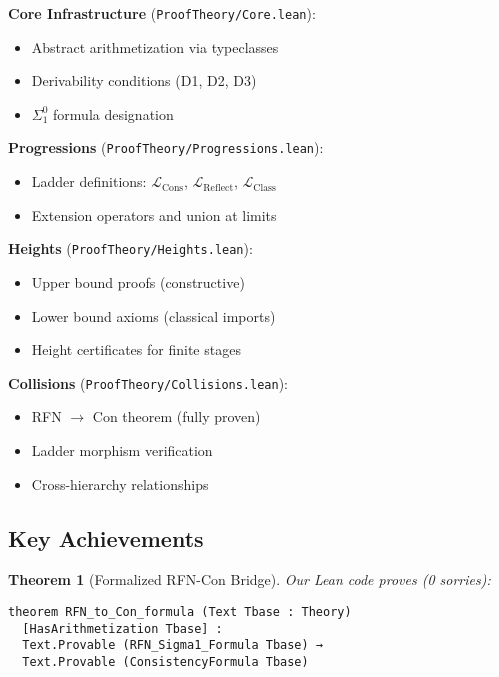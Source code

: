\documentclass[11pt]{article}
\newtheorem{theorem}{Theorem}[section]
\newcommand{\LCons}{\mathcal{L}_{\mathrm{Cons}}}
\newcommand{\LReflect}{\mathcal{L}_{\mathrm{Reflect}}}
\newcommand{\LClass}{\mathcal{L}_{\mathrm{Class}}}
\begin{document}
\begin{mdframed}[style=formalbox]
\textbf{Core Infrastructure} (\texttt{ProofTheory/Core.lean}):
\begin{itemize}
\item Abstract arithmetization via typeclasses
\item Derivability conditions (D1, D2, D3)
\item $\Sigma^0_1$ formula designation
\end{itemize}

\textbf{Progressions} (\texttt{ProofTheory/Progressions.lean}):
\begin{itemize}
\item Ladder definitions: $\LCons$, $\LReflect$, $\LClass$
\item Extension operators and union at limits
\end{itemize}

\textbf{Heights} (\texttt{ProofTheory/Heights.lean}):
\begin{itemize}
\item Upper bound proofs (constructive)
\item Lower bound axioms (classical imports)
\item Height certificates for finite stages
\end{itemize}

\textbf{Collisions} (\texttt{ProofTheory/Collisions.lean}):
\begin{itemize}
\item RFN $\to$ Con theorem (fully proven)
\item Ladder morphism verification
\item Cross-hierarchy relationships
\end{itemize}
\end{mdframed}

\subsection{Key Achievements}

\begin{theorem}[Formalized RFN-Con Bridge]
Our Lean code proves (0 sorries):
\begin{lstlisting}[language=Lean]
theorem RFN_to_Con_formula (Text Tbase : Theory) 
  [HasArithmetization Tbase] :
  Text.Provable (RFN_Sigma1_Formula Tbase) →
  Text.Provable (ConsistencyFormula Tbase)
\end{lstlisting}
\end{theorem}
\end{document}
